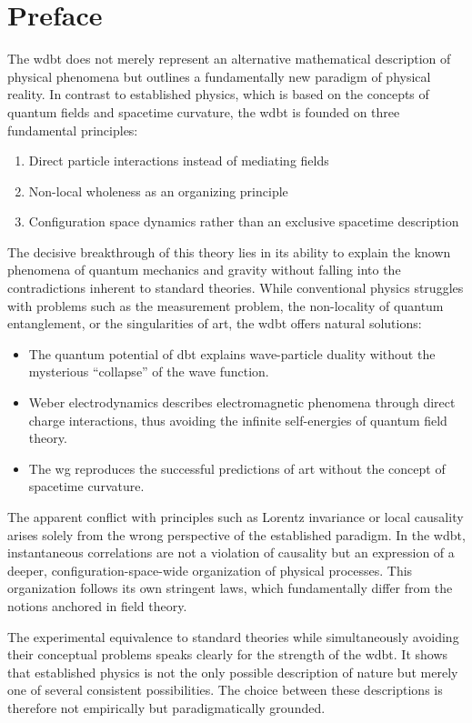 \documentclass[11pt, a5paper, twoside, openright]{book}
\begin{document}
\chapter*{Preface}
The \gls{wdbt} does not merely represent an alternative mathematical description of physical phenomena but outlines a fundamentally new paradigm of physical reality.
In contrast to established physics, which is based on the concepts of quantum fields and spacetime curvature, the \gls{wdbt} is founded on three fundamental principles:
\begin{enumerate}
    \item Direct particle interactions instead of mediating fields
    \item Non-local wholeness as an organizing principle
    \item Configuration space dynamics rather than an exclusive spacetime description
\end{enumerate}
The decisive breakthrough of this theory lies in its ability to explain the known phenomena of quantum mechanics and gravity without falling into the contradictions
inherent to standard theories. While conventional physics struggles with problems such as the measurement problem, the non-locality of quantum entanglement, or the singularities
of \gls{art}, the \gls{wdbt} offers natural solutions:
\begin{itemize}
    \item The quantum potential of \gls{dbt} explains wave-particle duality without the mysterious \enquote{collapse} of the wave function.
    \item Weber electrodynamics describes electromagnetic phenomena through direct charge interactions, thus avoiding the infinite self-energies of quantum field theory.
    \item The \gls{wg} reproduces the successful predictions of \gls{art} without the concept of spacetime curvature.
\end{itemize}
The apparent conflict with principles such as Lorentz invariance or local causality arises solely from the wrong perspective of the established paradigm.
In the \gls{wdbt}, instantaneous correlations are not a violation of causality but an expression of a deeper, configuration-space-wide organization of physical processes.
This organization follows its own stringent laws, which fundamentally differ from the notions anchored in field theory.

The experimental equivalence to standard theories while simultaneously avoiding their conceptual problems speaks clearly for the strength of the \gls{wdbt}. It shows
that established physics is not the only possible description of nature but merely one of several consistent possibilities. The choice between these descriptions
is therefore not empirically but paradigmatically grounded.
\end{document}
